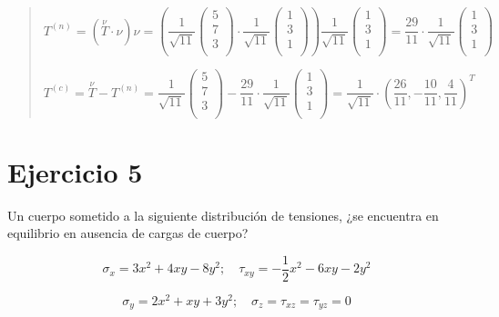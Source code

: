\documentclass[a4paper,12pt,twoside,final,spanish]{article}
\begin{document}
\begin{quote}
\[
T^{(n)}=(\stackrel \nu T\cdot\nu)\nu=\left(
\frac{1}{\sqrt{11}}
\left(\begin{matrix}
5 \\
7 \\
3 \\
\end{matrix}\right)\cdot
\frac{1}{\sqrt{11}}
\left(\begin{matrix}
1 \\
3 \\
1 \\
\end{matrix}\right)\right)
\frac{1}{\sqrt{11}}
\left(\begin{matrix}
1 \\
3 \\
1 \\
\end{matrix}\right)=
\frac{29}{11}\cdot
\frac{1}{\sqrt{11}}
\left(\begin{matrix}
1 \\
3 \\
1 \\
\end{matrix}\right)
\]

\[
T^{(c)}=\stackrel \nu T-T^{(n)}=
\frac{1}{\sqrt{11}}
\left(\begin{matrix}
5 \\
7 \\
3 \\
\end{matrix}\right)-
\frac{29}{11}\cdot
\frac{1}{\sqrt{11}}
\left(\begin{matrix}
1 \\
3 \\
1 \\
\end{matrix}\right)=\frac{1}{\sqrt{11}}\cdot
\left(\frac{26}{11},-\frac{10}{11},\frac{4}{11}\right)^{T}
\]

\end{quote}

\section*{Ejercicio 5}

Un cuerpo sometido a la siguiente distribución de tensiones, ¿se encuentra en equilibrio en ausencia de cargas de cuerpo?

\[
\sigma_{x}=3x^{2}+4xy-8y^{2};\quad\tau_{xy}=-\frac{1}{2}x^{2}-6xy-2y^{2}
\]

\[
\sigma_{y}=2x^{2}+xy+3y^{2};\quad\sigma_{z}=\tau_{xz}=\tau_{yz}=0
\]
\end{document}
